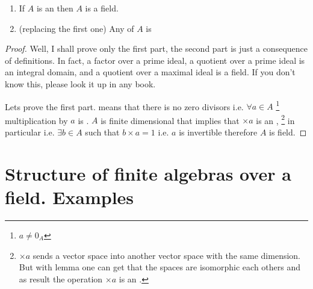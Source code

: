\begin{proposition}
  \begin{enumerate}
    \item If $A$ is an  then $A$ is a
      field.
    \item (replacing the first one) Any
       of $A$ is 
  \end{enumerate}
  \begin{proof}
     Well, I shall prove only the first part, the second part is just
     a consequence of definitions. In fact, a factor over a prime
     ideal, a quotient over a prime ideal is an integral domain, and a
     quotient over a maximal ideal is a field. If you don't know this,
     please look it up in any book.

     Lets prove the first part.  means
     that there is no zero divisors i.e. $\forall a \in A$
     \footnote{
       $a \ne 0_A$
     }
     multiplication by $a$ is . $A$ is finite
     dimensional  that implies that $\times a$ is an
     ,
     \footnote{
       $\times a$ sends a vector space  into another vector space with
       the same dimension. But with lemma  one
       can get that the spaces are isomorphic each others and as
       result the operation $\times a$ is an .
     }
     in particular  i.e. $\exists b \in A$
     such that $b \times a = 1$ i.e. $a$ is invertible therefore
     $A$ is field.     
  \end{proof}
  \label{prop:lec4_ideals}
\end{proposition}

\section{Structure of finite algebras over a field. Examples}

